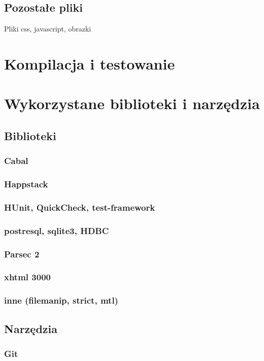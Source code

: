 \documentclass[11pt,leqno]{article}
\begin{document}
\subsection{Pozostałe pliki}
Pliki css, javascript, obrazki

\section{Kompilacja i testowanie}

\section{Wykorzystane biblioteki i narzędzia}
\subsection{Biblioteki}
\subsubsection{Cabal}
\subsubsection{Happstack}
\subsubsection{HUnit, QuickCheck, test-framework}
\subsubsection{postresql, sqlite3, HDBC}
\subsubsection{Parsec 2}
\subsubsection{xhtml 3000}
\subsubsection{inne (filemanip, strict, mtl)}

\subsection{Narzędzia}
\subsubsection{Git}
\end{document}
